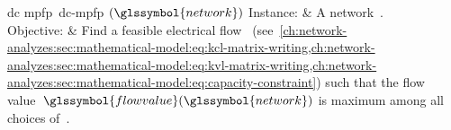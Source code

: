 \begin{problem}[framed]{\acrlong{dc} \acrlong{mpfp}~\gls{dc}-\gls{mpfp}%
$(\glssymbol{network})$}%
  Instance: & A network~\dcnetworktuple.\\
  Objective: & Find a feasible electrical flow~
  (see~\cref{ch:network-analyzes:sec:mathematical-model:eq:kcl-matrix-writing,ch:network-analyzes:sec:mathematical-model:eq:kvl-matrix-writing,ch:network-analyzes:sec:mathematical-model:eq:capacity-constraint}) 
  such that the flow value~$\glssymbol{flowvalue}(\glssymbol{network})$ is
  maximum among all choices of~.
\end{problem}%